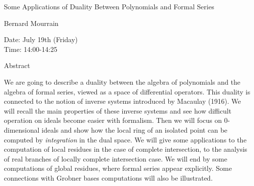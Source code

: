 \begin{center}
\LARGE
Some Applications of Duality Between Polynomials and
                         Formal Series
\end{center}

\begin{center}
\Large
Bernard Mourrain

\end{center}

\noindent
Date:  July 19th (Friday)\\
Time: 14:00-14:25\\

\begin{center}
\large
Abstract
\end{center}

We are going to describe a duality between the algebra of polynomials
and the algebra of formal series, viewed as a space of differential
operators. This duality is connected to the notion of inverse systems
introduced by Macaulay (1916). We will recall the main properties of
these inverse systems and see how difficult operation on ideals become
easier with formalism. Then we will focus on 0-dimensional ideals and
show how the local ring of an isolated point can be computed by
{\it integration} in the dual space. We will give some applications to the
computation of local residues in the case of complete intersection, to
the analysis of real branches of locally complete intersection case.
We will end by some computations of global residues, where formal
series appear explicitly. Some connections with Grobner bases
computations will also be illustrated.


